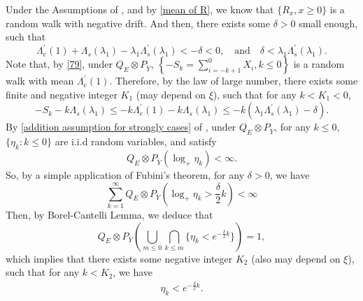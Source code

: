 \documentclass[]{article}
\makeatletter
\numberwithin{equation}{section}
\renewenvironment{proof}[1][\proofname]{%
	\par\pushQED{\qed}\normalfont%
	\topsep6\p@\@plus6\p@\relax
	\trivlist\item[\hskip\labelsep\bfseries#1\@addpunct{.}]%
	\ignorespaces
}{%
	\popQED\endtrivlist\@endpefalse
}
\theoremstyle{thmstyleone}%
\theoremstyle{thmstyletwo}%
\theoremstyle{thmstylethree}%
\theoremstyle{thmstylefour}%
\theoremstyle{thmstylefive}%
\theoremstyle{thmstylesix}%
\makeatother
\begin{document}
	\begin{proof}[Proof of \Cref{Lemma of Strongly}]
		Under the Assumptions of , and by \cref{mean of R}, we know that $\{R_x,x\geqslant0\}$ is a random walk with negative drift.
		And then, there exists some $\delta>0$ small enough, such that 
		\begin{equation*}
			\Lambda_e^\prime(1)+\Lambda_s(\lambda_1)-\lambda_1\Lambda_s^\prime(\lambda_1)<-\delta<0, \quad \text{and} \quad 
			\delta<\lambda_1\Lambda_s^{\prime}(\lambda_1).
		\end{equation*}
		Note that, by \cref{79}, under $Q_E\otimes P_{\overline{Y}}$, $\left\{-S_{k} = \sum\limits_{i=-k+1}^{0} X_i,k\leqslant 0\right\}$ is a random walk with mean $\Lambda_e^\prime(1)$. Therefore, by the law of large number, there exists some finite and negative integer $K_1$ (may depend on $\xi$), such that for any $k<K_1<0$,
		\begin{equation}\label{58}
			-S_{k}-k\Lambda_s(\lambda_1) \leqslant
			-k\Lambda_e^\prime(1)-k \Lambda_s(\lambda_1)
			\leqslant -k(\lambda_1\Lambda_s^\prime(\lambda_1) -\delta).
		\end{equation}
		By \cref{addition assumption for strongly cases} of , under $Q_E\otimes P_{\overline{Y}}$, for any $k\leqslant 0$, $\{\eta_{k}:k\leqslant 0\}$ are i.i.d random variables, and satisfy
		\begin{equation*}
			Q_E\otimes P_{\overline{Y}} \left( \log_+\eta_{k} \right)<\infty.
		\end{equation*}
		So, by a simple application of Fubini's theorem, for any $\delta>0$, we have
		\begin{equation*}
			\sum_{k=1}^{\infty}Q_E\otimes P_{\overline{Y}} \left( \log_+\eta_{k}>\frac{\delta}{2}k \right) <\infty
		\end{equation*}
		Then, by Borel-Cantelli Lemma, we deduce that
		\begin{equation*}
			Q_E\otimes P_{\overline{Y}} \left(\bigcup\limits_{m\leqslant 0}\bigcap\limits_{k\leqslant m} \{ \eta_{k} <e^{-\frac{\delta}{2}k}\}\right) =1,
		\end{equation*}
		which implies that there exists some negative integer $K_2$ (also may depend on $\xi$), such that for any $k<K_2$, we have
		\begin{align}\label{59}
			\eta_{k}<e^{-\frac{\delta}{2}k}.
		\end{align}
		

\end{proof}
\end{document}
